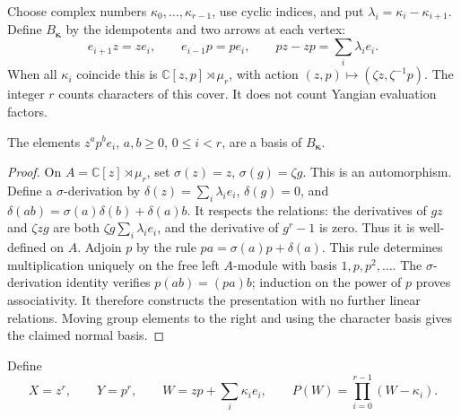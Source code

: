 Choose complex numbers \(\kappa_0,\ldots,\kappa_{r-1}\), use cyclic
indices, and put \(\lambda_i=\kappa_i-\kappa_{i+1}\).
Define \(B_{\boldsymbol\kappa}\) by the idempotents and two arrows
at each vertex:
\begin{equation}\label{eq:cs-cyclic-algebra}
 e_{i+1}z=ze_i,\qquad e_{i-1}p=pe_i,\qquad
 pz-zp=\sum_i\lambda_i e_i.
\end{equation}
When all \(\kappa_i\) coincide this is
\(\mathbb C[z,p]\rtimes\mu_r\), with action
\((z,p)\mapsto(\zeta z,\zeta^{-1}p)\).
The integer \(r\) counts characters of this cover. It does not
count Yangian evaluation factors.

\begin{lemma}\label{lem:cs-cyclic-normal}
The elements \(z^ap^be_i\), \(a,b\geq0\), \(0\leq i<r\), are a
basis of \(B_{\boldsymbol\kappa}\).
\end{lemma}
\begin{proof}
On \(A=\mathbb C[z]\rtimes\mu_r\), set
\(\sigma(z)=z\), \(\sigma(g)=\zeta g\).
This is an automorphism. Define a \(\sigma\)-derivation by
\(\delta(z)=\sum_i\lambda_i e_i\), \(\delta(g)=0\), and
\(\delta(ab)=\sigma(a)\delta(b)+\delta(a)b\).
It respects the relations: the derivatives of \(gz\) and
\(\zeta zg\) are both
\(\zeta g\sum_i\lambda_i e_i\), and the derivative of \(g^r-1\)
is zero. Thus it is well-defined on \(A\).
Adjoin \(p\) by the rule \(pa=\sigma(a)p+\delta(a)\).
This rule determines multiplication uniquely on the free left
\(A\)-module with basis \(1,p,p^2,\ldots\).
The \(\sigma\)-derivation identity verifies
\(p(ab)=(pa)b\); induction on the power of \(p\) proves
associativity. It therefore constructs the presentation with no
further linear relations. Moving group elements to the right and
using the character basis gives the claimed normal basis.
\end{proof}

Define
\[
 X=z^r,\qquad Y=p^r,\qquad
 W=zp+\sum_i\kappa_i e_i,\qquad
 P(W)=\prod_{i=0}^{r-1}(W-\kappa_i).
\]


